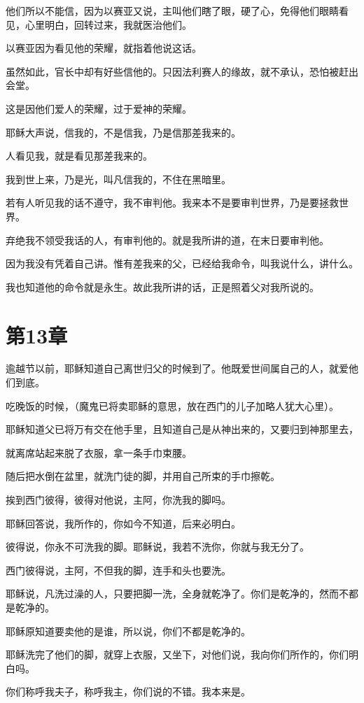 \documentclass[12pt,oneside]{book}
\begin{document}
他们所以不能信，因为以赛亚又说，主叫他们瞎了眼，硬了心，免得他们眼睛看见，心里明白，回转过来，我就医治他们。

以赛亚因为看见他的荣耀，就指着他说这话。

虽然如此，官长中却有好些信他的。只因法利赛人的缘故，就不承认，恐怕被赶出会堂。

这是因他们爱人的荣耀，过于爱神的荣耀。

耶稣大声说，信我的，不是信我，乃是信那差我来的。

人看见我，就是看见那差我来的。

我到世上来，乃是光，叫凡信我的，不住在黑暗里。

若有人听见我的话不遵守，我不审判他。我来本不是要审判世界，乃是要拯救世界。

弃绝我不领受我话的人，有审判他的。就是我所讲的道，在末日要审判他。

因为我没有凭着自己讲。惟有差我来的父，已经给我命令，叫我说什么，讲什么。

我也知道他的命令就是永生。故此我所讲的话，正是照着父对我所说的。

\chapter{第13章}
逾越节以前，耶稣知道自己离世归父的时候到了。他既爱世间属自己的人，就爱他们到底。

吃晚饭的时候，（魔鬼已将卖耶稣的意思，放在西门的儿子加略人犹大心里）。

耶稣知道父已将万有交在他手里，且知道自己是从神出来的，又要归到神那里去，

就离席站起来脱了衣服，拿一条手巾束腰。

随后把水倒在盆里，就洗门徒的脚，并用自己所束的手巾擦乾。

挨到西门彼得，彼得对他说，主阿，你洗我的脚吗。

耶稣回答说，我所作的，你如今不知道，后来必明白。

彼得说，你永不可洗我的脚。耶稣说，我若不洗你，你就与我无分了。

西门彼得说，主阿，不但我的脚，连手和头也要洗。

耶稣说，凡洗过澡的人，只要把脚一洗，全身就乾净了。你们是乾净的，然而不都是乾净的。

耶稣原知道要卖他的是谁，所以说，你们不都是乾净的。

耶稣洗完了他们的脚，就穿上衣服，又坐下，对他们说，我向你们所作的，你们明白吗。

你们称呼我夫子，称呼我主，你们说的不错。我本来是。
\end{document}
